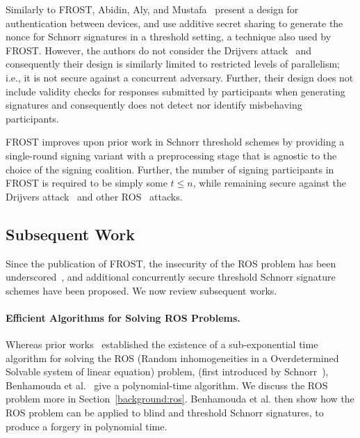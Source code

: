 Similarly to FROST,
Abidin, Aly, and Mustafa~\cite{AbidinAM20} present a design for
authentication between devices,
and use additive secret sharing to generate the nonce for Schnorr
signatures in a threshold setting, a technique
also used by FROST.
However, the authors do not consider the
Drijvers attack~\cite{DrijversEFKLNS19} and consequently their design is similarly limited to restricted levels of parallelism;
i.e., it is not secure against a concurrent adversary.
Further, their design does
not include validity checks for responses submitted by participants when
generating signatures and consequently does not detect nor identify
misbehaving participants.

FROST improves upon prior work in Schnorr threshold schemes by
providing a single-round signing variant with a preprocessing stage that is
agnostic to the choice of the signing coalition. Further, the number of signing
participants in FROST is required to be simply some $t\leq n$,
while remaining secure against the
Drijvers attack~\cite{DrijversEFKLNS19} and other ROS~\cite{schnorr06} attacks.









\subsection{Subsequent Work}

Since the publication of FROST,
the insecurity of the ROS problem has been underscored~\cite{BenhamoudaLLOR20},
and additional concurrently secure threshold Schnorr signature schemes have been proposed.
We now review subsequent works.

\paragraph{Efficient Algorithms for Solving ROS Problems.}
Whereas prior works~\cite{DrijversEFKLNS19,Wagner02} established the existence of a sub-exponential time algorithm
for solving the ROS (Random inhomogeneities in a Overdetermined Solvable system of linear equation) problem,
(first introduced by Schnorr~\cite{schnorr06}),
Benhamouda et al.~\cite{BenhamoudaLLOR20} give a polynomial-time algorithm.
We discuss the ROS problem more in Section~\ref{background:ros}.
Benhamouda et al. then show how the ROS problem can be applied to blind and threshold Schnorr signatures,
to produce a forgery in polynomial time.

